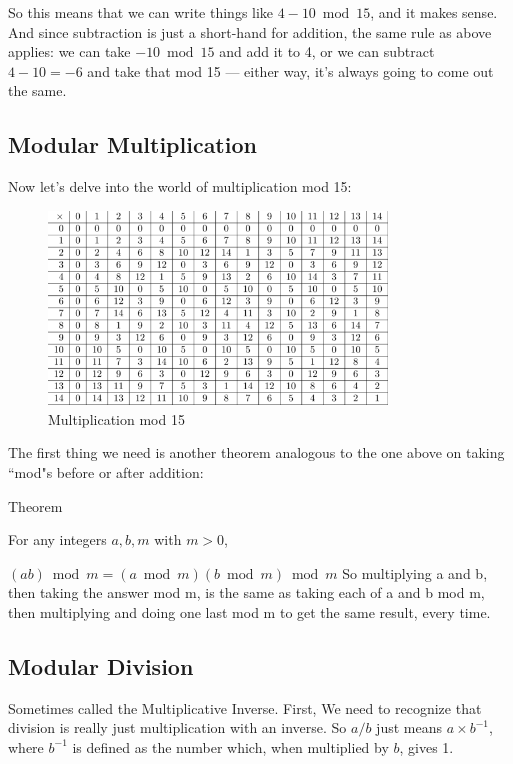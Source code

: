 \documentclass{report}
\begin{document}
So this means that we can write things like \(4 - 10 \bmod 15\), and it makes sense. And since subtraction is just a short-hand for addition, the same rule as above applies: we can take \(-10\bmod 15\) and add it to 4, or we can subtract \(4-10=-6\) and take that mod 15 — either way, it's always going to come out the same.

\subsection{Modular Multiplication}

Now let's delve into the world of multiplication mod 15:

\begin{figure}[h!]
  \centering
  \includegraphics[width=90mm,scale=0.5]{m15.png}
  \caption{Multiplication mod 15}
\end{figure}


The first thing we need is another theorem analogous to the one above on taking ``mod"s before or after addition:


Theorem

For any integers \(a,b,m\) with \(m > 0\),

\((ab) \bmod m = (a \bmod m)(b \bmod m) \bmod m\)
\newline
\newline
So multiplying a and b, then taking the answer mod m, is the same as taking each of a and b mod m, then multiplying and doing one last mod m to get the same result, every time.

\subsection{Modular Division}
Sometimes called the Multiplicative Inverse. First, We need to recognize that division is really just multiplication with an inverse. So \(a/b\) just means \(a\times b^{-1}\), where \(b^{-1}\) is defined as the number which, when multiplied by $b$, gives 1.
\end{document}

